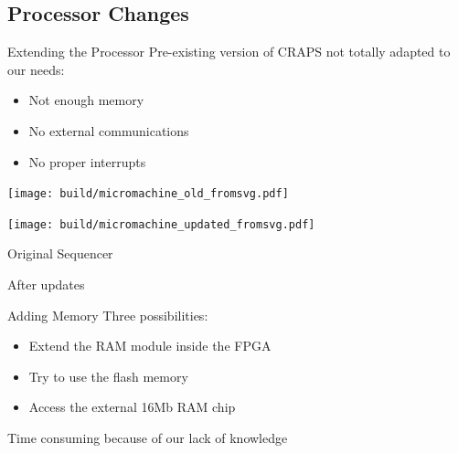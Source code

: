 \documentclass{beamer}
\begin{document}
    \subsection{Processor Changes}

          \begin{frame}{Extending the Processor}
          Pre-existing version of CRAPS not totally adapted to our needs:
          \begin{itemize}
            \item Not enough memory
            \item No external communications
            \item No proper interrupts
          \end{itemize}
      \end{frame}

      \begin{landscape}
        \begin{frame}[plain]
            \texttt{[image: build/micromachine\_old\_fromsvg.pdf]}

        \end{frame}
        \begin{frame}[plain]
            \texttt{[image: build/micromachine\_updated\_fromsvg.pdf]}

        \end{frame}
      \end{landscape}

      \begin{frame}{Original Sequencer}
          \begin{figure}
            \centering
          \end{figure}
      \end{frame}

      \begin{frame}{After updates}
        \begin{figure}
          \centering
        \end{figure}
      \end{frame}

      \begin{frame}{Adding Memory}
          Three possibilities:
          \begin{itemize}
            \item Extend the RAM module inside the FPGA
            \item Try to use the flash memory
            \item Access the external 16Mb RAM chip
        \end{itemize}

          Time consuming because of our lack of knowledge
      \end{frame}
\end{document}
